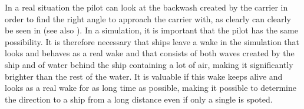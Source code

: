 In a real situation the pilot can look at the backwash created by the carrier in order to find the right angle to approach the carrier with, as clearly can clearly be seen in \citep{Alivewithpassion2007} (see also ). In a simulation, it is important that the pilot has the same possibility. It is therefore necessary that ships leave a wake in the simulation that looks and behaves as a real wake and that consists of both waves created by the ship and of water behind the ship containing a lot of air, making it significantly brighter than the rest of the water. It is valuable if this wake keeps alive and looks as a real wake for as long time as possible, making it possible to determine the direction to a ship from a long distance even if only a single  is spoted.